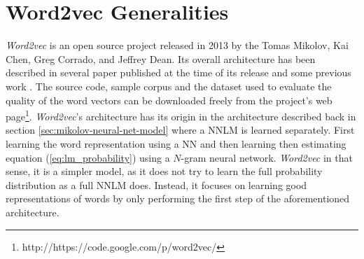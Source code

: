 






\section{Word2vec Generalities}
\label{sec:word2v-generalities}

\textit{Word2vec} is an open source project released in 2013 by the Tomas
Mikolov,  Kai Chen, Greg Corrado, and Jeffrey Dean.  
Its overall architecture has been described in several paper published at the
time of its release
\cite{DBLP:journals/corr/abs-1301-3781,MikolovSCCD13,conf/naacl/MikolovYZ13} 
and some previous work \cite{mikolovphd2012}. The source code, sample corpus
and the dataset used to evaluate the quality of the word vectors  can be downloaded freely from the project's
 web page\footnote{http://https://code.google.com/p/word2vec/}.
\textit{Word2vec}'s architecture
has its origin  in the architecture described back in section 
\ref{sec:mikolov-neural-net-model} where a \ac{NNLM} is learned separately. 
First learning the word representation using a \ac{NN} and then learning then
estimating equation (\ref{eq:lm_probability}) using a $N$-gram neural
network.  \textit{Word2vec} in that sense, it  is a simpler model, as it  does not
try to learn the full probability distribution as a full \ac{NNLM} does.
Instead, it  focuses on learning good representations of words by  only
performing  the first step  of the aforementioned architecture. %


